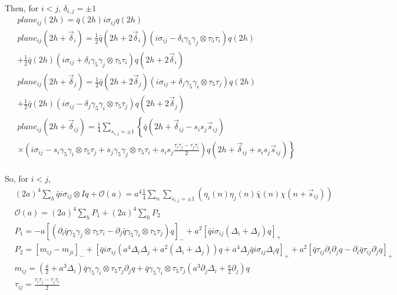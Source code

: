 Then, for $i<j$, $\delta_{i,j}=\pm 1$
\begin{equation}
\begin{split}
&plane_{ij}(2h)=\bar{q}(2h) i \sigma _{ij} q(2h)\\
&plane_{ij}(2h+\vec{\delta} _i)=\frac{1}{2}\bar{q}(2h+2\vec{\delta} _i) \left(i \sigma _{ij} -\delta _i \gamma_5\gamma _j\otimes \tau _5\tau _i\right)q(2h)\\
&+\frac{1}{2}\bar{q}(2h) \left(i \sigma _{ij} +\delta _i \gamma_5\gamma _j\otimes \tau _5\tau _i\right)q(2h+2\vec{\delta} _i)\\
&plane_{ij}(2h+\vec{\delta} _j)=\frac{1}{2}\bar{q}(2h+2\vec{\delta} _j) \left(i \sigma _{ij} +\delta _j \gamma_5\gamma _i\otimes \tau _5\tau _j\right)q(2h)\\
&+\frac{1}{2}\bar{q}(2h) \left(i \sigma _{ij} -\delta _j \gamma_5\gamma _i\otimes \tau _5\tau _j\right)q(2h+2\vec{\delta} _j)\\
&plane_{ij}(2h+\vec{\delta} _{ij})=\frac{1}{4}\sum _{s_{i,j}=\pm 1}\left\{\bar{q}(2h+\vec{\delta}_{ij}-s_is_j\vec{s}_{ij})\right.\\
&\left.\times \left(i\sigma_{ij}-s_i \gamma_5\gamma_i\otimes \tau _5\tau _j +s_j \gamma_5\gamma_j\otimes \tau _5\tau _i +s_is_j\frac{\tau_i\tau_j-\tau_j\tau_i}{2}\right)q(2h+\vec{\delta}_{ij}+s_is_j\vec{s}_{ij})\right\}\\
\end{split}
\end{equation}

So, for $i<j$,
\textcolor[rgb]{0,0,1}{
\begin{equation}
\begin{split}
&(2a)^4\sum _h \bar{q}i\sigma _{ij}\otimes I q + \mathcal{O}(a) = a^4 \frac{1}{4}\sum _n \sum _{s_{i,j}=\pm 1}\left(\eta _i(n)\eta _j(n)\bar{\chi}(n)\chi(n+\vec{s}_{ij})\right)\\
&\mathcal{O}(a) =(2a)^4\sum _h P_1+(2a)^4\sum _h P_2\\
&P_1=-a\left[\left(\partial _i \bar{q} \gamma_5\gamma_j\otimes \tau _5\tau _i -\partial _j \bar{q} \gamma_5\gamma_i\otimes \tau _5\tau _j\right)q\right]_- + a^2 \left[\bar{q}i\sigma _{ij}\left(\Delta_i + \Delta _ j\right)q\right]_+\\
&P_2=\left[m_{ij}-m_{ji}\right]_-+\left[\bar{q}i\sigma _{ij}\left(a^4\Delta_i\Delta_j+a^2(\Delta_i+\Delta_j)\right)q+a^4\Delta_j \bar{q}i\sigma_{ij}\Delta_i q\right]_++a^2\left[\bar{q}\tau_{ij}\partial_i\partial_j q -\partial _i \bar{q}\tau_{ij}\partial _j q\right]_+\\
&m_{ij}=\left(\frac{a}{2}+a^3\Delta _i\right)\bar{q}\gamma_5 \gamma_i\otimes \tau _5\tau _j \partial _j q +\bar{q} \gamma_5 \gamma_i\otimes \tau _5\tau _j\left(a^3 \partial _j \Delta _i +\frac{a}{2}\partial _j\right)q\\
&\tau _{ij}=\frac{\tau_i\tau_j-\tau_j\tau_i}{2}
\end{split}
\end{equation} 
}

